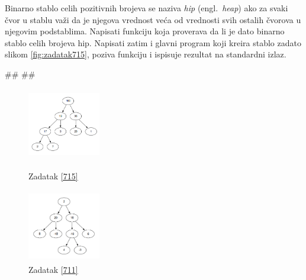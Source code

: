 \begin{Answer}[ref=714]
\end{Answer}


\begin{Exercise}[label=715]
Binarno stablo celih pozitivnih brojeva se naziva \emph{hip} (engl.~{\em heap}) ako za svaki čvor u stablu važi da je njegova vrednost veća od vrednosti svih ostalih čvorova u njegovim podstablima. Napisati funkciju  koja proverava da li je dato binarno stablo celih brojeva hip. Napisati zatim i glavni program koji kreira stablo zadato slikom \ref{fig:zadatak715}, poziva funkciju  i ispisuje rezultat na standardni izlaz. 

\begin{miditest}
\begin{test}{1}
#\naslovIzlaz#
##
\end{test}
\end{miditest}
\end{Exercise}

\begin{Answer}[ref=715]
\end{Answer}

\begin{figure}[!htb]

\includegraphics[height=120px,width=120px]{poglavlja/slike/heap.png}
\caption{Zadatak \ref{715}}
\label{fig:zadatak715}
\endminipage\hfill
{}
\includegraphics[height=120px,width=120px]{poglavlja/slike/binarna_stabla.png}
\caption{Zadatak \ref{711}}
\label{fig:zadatak711}
\endminipage\hfill

\end{figure}


